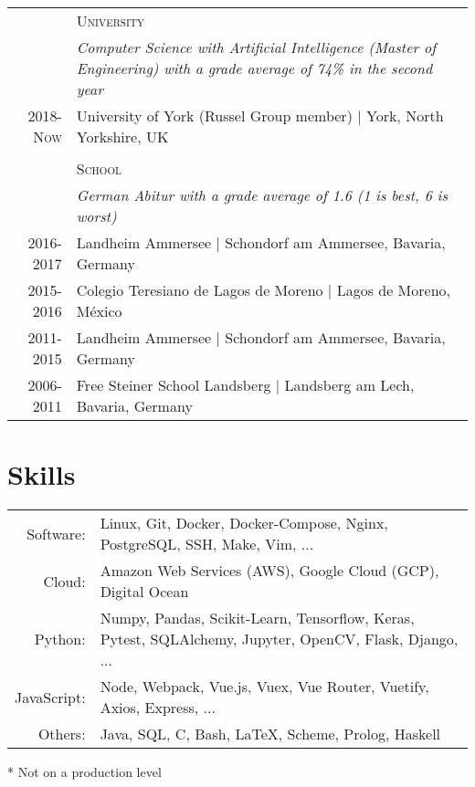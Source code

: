 \documentclass[a4paper,10pt]{article}
\begin{document}
\begin{tabular}{r|p{11cm}}

                    & \textsc{University} \\
                    & \emph{Computer Science with Artificial Intelligence
                    (Master of Engineering) with a grade average of 74\% in the
                    second year} \\
    \textsc{2018-Now}   & University of York (Russel Group member) | York, North Yorkshire, UK \\
\multicolumn{2}{c}{}\\
                    & \textsc{School} \\
                    & \emph{German \emph{Abitur} with a grade average of 1.6 (1
                    is best, 6 is worst)} \\
\textsc{2016-2017}  & Landheim Ammersee | Schondorf am Ammersee, Bavaria, Germany \\
\textsc{2015-2016}  & Colegio Teresiano de Lagos de Moreno |  Lagos de Moreno, México \\
\textsc{2011-2015}  & Landheim Ammersee | Schondorf am Ammersee, Bavaria, Germany \\
\textsc{2006-2011}  & Free Steiner School Landsberg | Landsberg am Lech, Bavaria, Germany \\

\end{tabular}


\section{Skills}
\renewcommand{\thefootnote}{*}
\begin{threeparttable}
\begin{tabular}{ r p{} }
    Software:   & Linux, Git, Docker, Docker-Compose, Nginx, PostgreSQL, SSH, Make, Vim, ... \\
    Cloud:      & Amazon Web Services (AWS), Google Cloud (GCP), Digital Ocean \vspace{2mm} \\
    Python:     & Numpy, Pandas, Scikit-Learn, Tensorflow, Keras, Pytest, SQLAlchemy, Jupyter, OpenCV, Flask, Django, ... \\
    JavaScript: & Node, Webpack, Vue.js, Vuex, Vue Router, Vuetify, Axios, Express, ... \\
    Others:     & Java, SQL, C, Bash, \LaTeX, Scheme\footnotemark, Prolog\footnotemark, Haskell\footnotemark
\end{tabular}
\begin{tablenotes}
    \small\item[*] Not on a production level
  \end{tablenotes}
\end{threeparttable}
\end{document}

